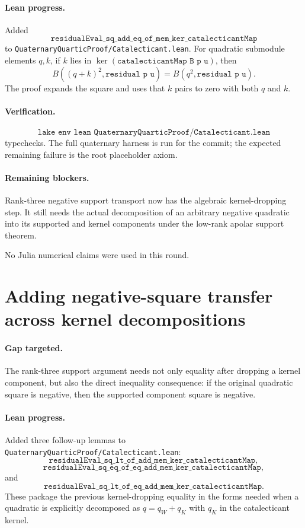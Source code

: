 \documentclass[11pt]{article}
\begin{document}
\paragraph{Lean progress.}
Added
\[
\texttt{residualEval\_sq\_add\_eq\_of\_mem\_ker\_catalecticantMap}
\]
to \texttt{QuaternaryQuarticProof/Catalecticant.lean}.  For quadratic
submodule elements \(q,k\), if \(k\) lies in
\(\ker(\texttt{catalecticantMap B p u})\), then
\[
B((q+k)^2,\texttt{residual p u})=B(q^2,\texttt{residual p u}).
\]
The proof expands the square and uses that \(k\) pairs to zero with both
\(q\) and \(k\).

\paragraph{Verification.}
\[
\texttt{lake env lean QuaternaryQuarticProof/Catalecticant.lean}
\]
typechecks.  The full quaternary harness is run for the commit; the expected
remaining failure is the root placeholder axiom.

\paragraph{Remaining blockers.}
Rank-three negative support transport now has the algebraic kernel-dropping
step.  It still needs the actual decomposition of an arbitrary negative
quadratic into its supported and kernel components under the low-rank apolar
support theorem.

No Julia numerical claims were used in this round.

\section*{Adding negative-square transfer across kernel decompositions}

\paragraph{Gap targeted.}
The rank-three support argument needs not only equality after dropping a kernel
component, but also the direct inequality consequence: if the original
quadratic square is negative, then the supported component square is negative.

\paragraph{Lean progress.}
Added three follow-up lemmas to
\texttt{QuaternaryQuarticProof/Catalecticant.lean}:
\[
\texttt{residualEval\_sq\_lt\_of\_add\_mem\_ker\_catalecticantMap},
\]
\[
\texttt{residualEval\_sq\_eq\_of\_eq\_add\_mem\_ker\_catalecticantMap},
\]
and
\[
\texttt{residualEval\_sq\_lt\_of\_eq\_add\_mem\_ker\_catalecticantMap}.
\]
These package the previous kernel-dropping equality in the forms needed when a
quadratic is explicitly decomposed as \(q=q_W+q_K\) with \(q_K\) in the
catalecticant kernel.
\end{document}
